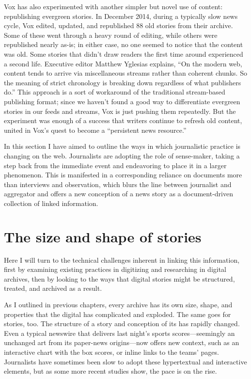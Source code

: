 Vox has also experimented with another simpler but novel use of content: republishing evergreen stories. In December 2014, during a typically slow news cycle, Vox edited, updated, and republished 88 old stories from their archive.\autocite{yglesias_refreshing_2015} Some of these went through a heavy round of editing, while others were republished nearly as-is; in either case, no one seemed to notice that the content was old. Some stories that didn't draw readers the first time around experienced a second life. Executive editor Matthew Yglesias explains, ``On the modern web, content tends to arrive via miscellaneous streams rather than coherent chunks. So the meaning of strict chronology is breaking down regardless of what publishers do.''\autocite{yglesias_refreshing_2015} This approach is a sort of workaround of the traditional stream-based publishing format; since we haven't found a good way to differentiate evergreen stories in our feeds and streams, Vox is just pushing them repeatedly. But the experiment was enough of a success that writers continue to refresh old content, united in Vox's quest to become a ``persistent news resource.''\autocite{yglesias_refreshing_2015}

In this section I have aimed to outline the ways in which journalistic practice is changing on the web. Journalists are adopting the role of sense-maker, taking a step back from the immediate event and endeavoring to place it in a larger phenomenon. This is manifested in a corresponding reliance on documents more than interviews and observation, which blurs the line between journalist and aggregator and offers a new conception of a news story as a document-driven collection of linked information.

\section{The size and shape of stories}

Here I will turn to the technical challenges inherent in linking this information, first by examining existing practices in digitizing and researching in digital archives, then by looking to the ways that digital stories might be structured, treated, and archived as a result. 

As I outlined in previous chapters, every archive has its own size, shape, and properties that the digital has complicated and exploded. The same goes for stories, too. The structure of a story and conception of its has rapidly changed. Even a typical newswire that delivers last night's sports scores---seemingly an unchanged art from its paper-news origins---now offers new context, such as an interactive chart with the box scores, or inline links to the teams' pages. Journalists have sometimes been slow to adopt these hypertextual and interactive elements, but as some more recent studies show, the pace is on the rise.\autocites[See, e.g.,][]{coddington_building_2012}{coddington_normalizing_2014}{larsson_staying_2013}

